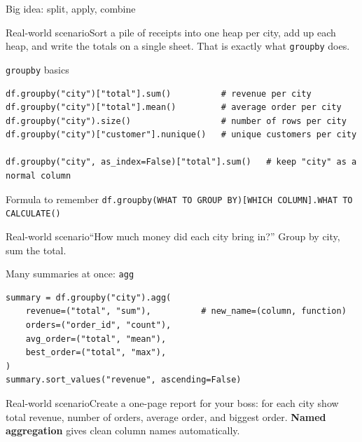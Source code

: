 \documentclass[aspectratio=169,10pt]{beamer}
\newcommand{\code}[1]{\texttt{#1}}
\newcommand{\scenario}[1]{\begin{exampleblock}{Real-world scenario}#1\end{exampleblock}}
\begin{document}
\begin{frame}{Big idea: split, apply, combine}
  \begin{center}
  \end{center}
  \vspace{2mm}
  \scenario{Sort a pile of receipts into one heap per city, add up each heap, and write the
  totals on a single sheet. That is exactly what \code{groupby} does.}
\end{frame}

\begin{frame}[fragile]{\texttt{groupby} basics}
\begin{lstlisting}
df.groupby("city")["total"].sum()          # revenue per city
df.groupby("city")["total"].mean()         # average order per city
df.groupby("city").size()                  # number of rows per city
df.groupby("city")["customer"].nunique()   # unique customers per city

df.groupby("city", as_index=False)["total"].sum()   # keep "city" as a normal column
\end{lstlisting}
  \begin{block}{Formula to remember}
    \code{df.groupby(WHAT TO GROUP BY)[WHICH COLUMN].WHAT TO CALCULATE()}
  \end{block}
  \scenario{``How much money did each city bring in?'' Group by city, sum the total.}
\end{frame}

\begin{frame}[fragile]{Many summaries at once: \texttt{agg}}
\begin{lstlisting}
summary = df.groupby("city").agg(
    revenue=("total", "sum"),          # new_name=(column, function)
    orders=("order_id", "count"),
    avg_order=("total", "mean"),
    best_order=("total", "max"),
)
summary.sort_values("revenue", ascending=False)
\end{lstlisting}
  \scenario{Create a one-page report for your boss: for each city show total revenue, number
  of orders, average order, and biggest order. \textbf{Named aggregation} gives clean
  column names automatically.}
\end{frame}
\end{document}
